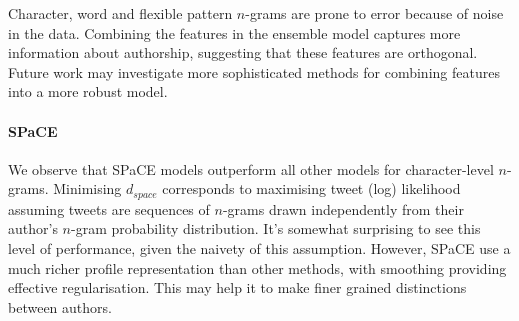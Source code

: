 \documentclass[twocolumn,10pt]{article}
\begin{document}

Character, word and flexible pattern $n$-grams are prone to
error because of noise in the data.
Combining the features in the ensemble model captures more
information about authorship, suggesting that these features
are orthogonal.
Future work may investigate more sophisticated methods for
combining features into a more robust model. 


\paragraph{SPaCE}
We observe that SPaCE models outperform all other models for
character-level $n$-grams.
Minimising $d_{space}$ corresponds to maximising
tweet (log) likelihood assuming tweets are sequences of
$n$-grams drawn independently from their author's $n$-gram
probability distribution.
It's somewhat surprising to see this level of performance,
given the naivety of this assumption.
However, SPaCE use a much richer profile representation
than other methods, with smoothing providing effective
regularisation. This may help it to make finer grained
distinctions between authors.
\end{document}
